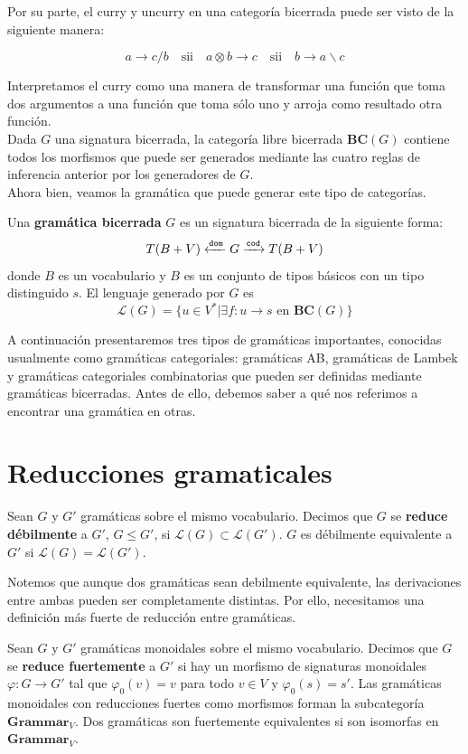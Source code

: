 \documentclass[../main.tex]{subfiles}
\begin{document}
	\noindent Por su parte, el curry y uncurry en una categoría bicerrada puede ser visto de la siguiente manera:
	
	$$a \to c/b \quad \text{sii} \quad a \otimes b \to c \quad \text{sii} \quad b \to a \backslash c$$
	
	\noindent Interpretamos el curry como una manera de transformar una función que toma dos argumentos a una función que toma sólo uno y arroja como resultado otra función.\\
	Dada $G$ una signatura bicerrada, la categoría libre bicerrada \textbf{BC}$(G)$ contiene todos los morfismos que puede ser generados mediante las cuatro reglas de inferencia anterior por los generadores de $G$. \\
	Ahora bien, veamos la gramática que puede generar este tipo de categorías. 
	
	\begin{dfn}
		Una \textbf{gramática bicerrada} $G$ es un signatura bicerrada de la siguiente forma:
			$$T(B+V) \xleftarrow{\tt{dom}} G \xrightarrow{\tt{cod}} T(B+V)$$
		donde $B$ es un vocabulario y $B$ es un conjunto de tipos básicos con un tipo distinguido $s$. El lenguaje generado por $G$ es
		\[
			\mathcal{L}(G)= \{ u \in V^* | \exists f:u \to s \text{ en } \textbf{BC}(G) \}
		\]
	\end{dfn}
	A continuación presentaremos tres tipos de gramáticas importantes, conocidas usualmente como gramáticas categoriales: gramáticas AB, gramáticas de Lambek y gramáticas categoriales combinatorias que pueden ser definidas mediante gramáticas bicerradas. Antes de ello, debemos saber a qué nos referimos a encontrar una gramática en otras.
	
	\section{Reducciones gramaticales}
	
	\begin{dfn}
		Sean $G$ y $G'$ gramáticas sobre el mismo vocabulario. Decimos que $G$ se \textbf{reduce débilmente} a $G'$, $G \leq G'$, si $\mathcal{L}(G) \subset \mathcal{L}(G')$. $G$ es débilmente equivalente a $G'$ si $\mathcal{L}(G) = \mathcal{L}(G')$. 
	\end{dfn}
	
	\noindent Notemos que aunque dos gramáticas sean debilmente equivalente, las derivaciones entre ambas pueden ser completamente distintas. Por ello, necesitamos una definición más fuerte de reducción entre gramáticas.
	
	\begin{dfn}
		Sean $G$ y $G'$ gramáticas monoidales sobre el mismo vocabulario. Decimos que $G$ se \textbf{reduce fuertemente} a $G'$ si hay un morfismo de signaturas monoidales 	$\varphi: G \to G'$ tal que $\varphi_0(v)=v$ para todo $v \in V$ y $\varphi_0(s)=s'$. Las gramáticas monoidales con reducciones fuertes como morfismos forman la subcategoría $\textbf{Grammar}_V$. Dos gramáticas son fuertemente equivalentes si son isomorfas en $\textbf{Grammar}_V$. 
	\end{dfn}
	
\end{document}
